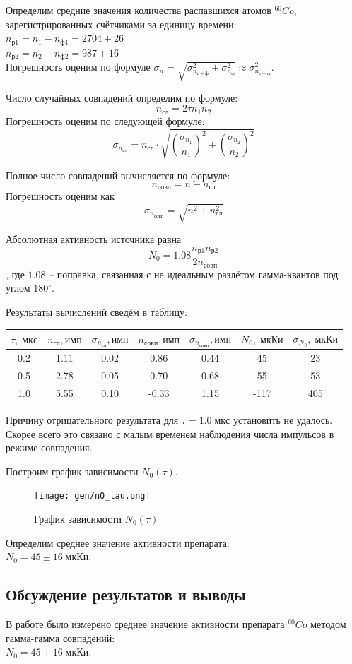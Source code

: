 \documentclass[10pt,a4paper]{article}
\begin{document}
	Определим средние значения количества распавшихся атомов ${}^{60}Co$, зарегистрированных счётчиками за единицу времени:\\
	$n_{р1} = n_{1} - n_{ф1} = 2704 \pm 26$\\
	$n_{р2} = n_{2} - n_{ф2} = 987  \pm 16$\\
	Погрешность оценим по формуле $\sigma_{n} = \sqrt{\sigma_{n_{с+ф}}^2 + \sigma_{n_ф}^2} \approx \sigma_{n_{с+ф}}^2$.
	
	Число случайных совпадений определим по формуле:
	$$n_{сл} = 2 \tau n_{1} n_{2}$$
	Погрешность оценим по следующей формуле:
	$$\sigma_{n_{сл}} = n_{сл} \cdot \sqrt{ \left(\frac{\sigma_{n_1}}{n_1}\right)^2 + \left(\frac{\sigma_{n_2}}{n_2}\right)^2 }$$
	
	Полное число совпадений вычисляется по формуле:
	$$
	n_{совп} = n - n_{сл}
	$$
	Погрешность оценим как
	$$
	\sigma_{n_{совп}} = \sqrt{n^2 + n_{сл}^2}
	$$
	
	Абсолютная активность источника равна
	$$
	N_0 = 1.08 \frac{n_{р1} n_{р2}}{2 n_{совп}}
	$$,
	где $1.08$ -- поправка, связанная с не идеальным разлётом гамма-квантов под углом $180^\circ$.
	
	Результаты вычислений сведём в таблицу:\\
	\begin{tabular}{ccccccc}
		\hline
		$\tau, \; мкс$ & $n_{сл}, имп$ & $\sigma_{n_{сл}}, имп$ & $n_{совп}, имп$ & $\sigma_{n_{совп}}, имп$ & $N_0, \; мкКи$ & $\sigma_{N_0}, \; мкКи$ \\
		\hline
		0.2 & 1.11 & 0.02 & 0.86 & 0.44 & 45 & 23 \\
		0.5 & 2.78 & 0.05 & 0.70 & 0.68 & 55 & 53 \\
		1.0 & 5.55 & 0.10 & -0.33 & 1.15 & -117 & 405 \\ 
		\hline
	\end{tabular}

	Причину отрицательного результата для $\tau = 1.0 \; мкс$ установить не удалось. Скорее всего это связано с малым временем наблюдения числа импульсов в режиме совпадения.

	Построим график зависимости $N_0(\tau)$.
	\begin{figure}
		\centering
		\texttt{[image: gen/n0\_tau.png]}
		\caption{График зависимости $N_0(\tau)$}
	\end{figure}

	Определим среднее значение активности препарата:\\
	$N_0 = 45 \pm 16 \; мкКи$.
	
	\subsection*{Обсуждение результатов и выводы}
	
	В работе было измерено среднее значение активности препарата ${}^{60} Co$ методом гамма-гамма совпадений:\\
	$N_0 = 45 \pm 16 \; мкКи$.
		
\end{document}
